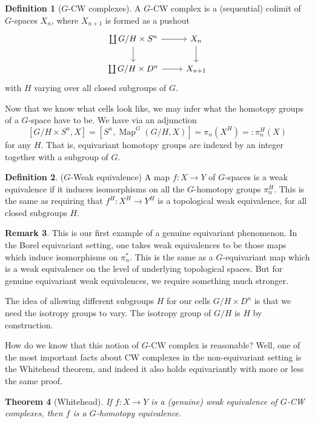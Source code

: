 \documentclass{amsart}
\newtheorem{thm}{Theorem}[section]
\theoremstyle{definition}
\newtheorem{defn}[thm]{Definition}
\newtheorem{remark}[thm]{Remark}
\numberwithin{thm}{section}
\def\Map{\operatorname{Map}}
\begin{document}
\begin{defn}[$G$-CW complexes]
    A $G$-CW complex is a (sequential) colimit of $G$-spaces $X_n$, where $X_{n+1}$ is formed as a pushout
    \[\begin{tikzcd}
        \coprod G/H \times S^n \arrow[d] \arrow[r] & X_n \arrow[d] \\
        \coprod G/H \times D^n \arrow[r]           & X_{n+1}      
        \end{tikzcd}\]
    with $H$ varying over all closed subgroups of $G$.
\end{defn}

Now that we know what cells look like, we may infer what the homotopy groups of a $G$-space have to be. We have via an adjunction
\[[G/H \times S^n, X] = [S^n, \Map^G(G/H, X)] = \pi_n(X^H) =: \pi^H_n(X)\]
for any $H$. That is, equivariant homotopy groups are indexed by an integer together with a subgroup of $G$.

\begin{defn}($G$-Weak equivalence)
    A map $f: X \to Y$ of $G$-spaces is a weak equivalence if it induces isomorphisms on all the $G$-homotopy groups $\pi_n^H$. This is the same as requiring that $f^H: X^H \to Y^H$ is a topological weak equivalence, for all closed subgroups $H$.
\end{defn}

\begin{remark}
    This is our first example of a genuine equivariant phenomenon. In the Borel equivariant setting, one takes weak equivalences to be those maps which induce isomorphisms on $\pi_n^*$. This is the same as a $G$-equivariant map which is a weak equivalence on the level of underlying topological spaces. But for genuine equivariant weak equivalences, we require something much stronger.
\end{remark}

The idea of allowing different subgroups $H$ for our cells $G/H \times D^n$ is that we need the isotropy groups to vary. The isotropy group of $G/H$ is $H$ by construction. 

How do we know that this notion of $G$-CW complex is reasonable? Well, one of the most important facts about CW complexes in the non-equivariant setting is the Whitehead theorem, and indeed it also holds equivariantly with more or less the same proof.

\begin{thm}[Whitehead]
    If $f: X \to Y$ is a (genuine) weak equivalence of $G$-CW complexes, then $f$ is a $G$-homotopy equivalence.
\end{thm}
\end{document}
